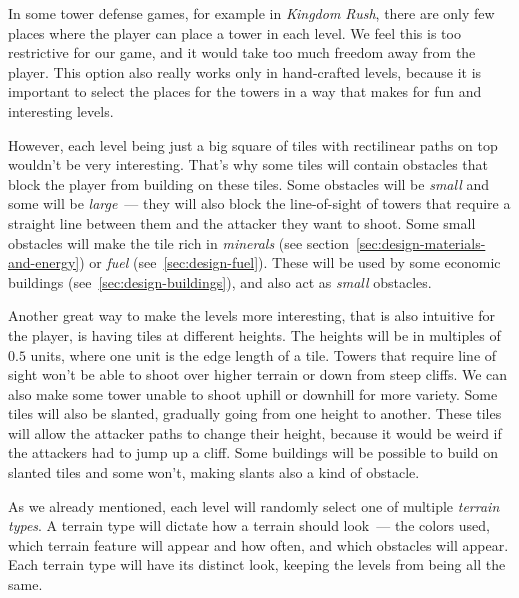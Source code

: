 In some tower defense games, for example in \emph{Kingdom Rush}, there are only few places where the player can place a tower in each level.
We feel this is too restrictive for our game, and it would take too much freedom away from the player.
This option also really works only in hand-crafted levels, because it is important to select the places for the towers in a way that makes for fun and interesting levels.

However, each level being just a big square of tiles with rectilinear paths on top wouldn't be very interesting.
That's why some tiles will contain obstacles that block the player from building on these tiles.
Some obstacles will be \emph{small} and some will be \emph{large}~--- they will also block the line-of-sight of towers that require a straight line between them and the attacker they want to shoot.
Some small obstacles will make the tile rich in \emph{minerals} (see section~\ref{sec:design-materials-and-energy}) or \emph{fuel} (see~\ref{sec:design-fuel}).
These will be used by some economic buildings (see~\ref{sec:design-buildings}), and also act as \emph{small} obstacles.

Another great way to make the levels more interesting, that is also intuitive for the player, is having tiles at different heights.
The heights will be in multiples of $0.5$ units, where one unit is the edge length of a tile.
Towers that require line of sight won't be able to shoot over higher terrain or down from steep cliffs.
We can also make some tower unable to shoot uphill or downhill for more variety.
Some tiles will also be slanted, gradually going from one height to another.
These tiles will allow the attacker paths to change their height, because it would be weird if the attackers had to jump up a cliff.
Some buildings will be possible to build on slanted tiles and some won't, making slants also a kind of obstacle.

As we already mentioned, each level will randomly select one of multiple \emph{terrain types}.
A terrain type will dictate how a terrain should look~--- the colors used, which terrain feature will appear and how often, and which obstacles will appear.
Each terrain type will have its distinct look, keeping the levels from being all the same.

